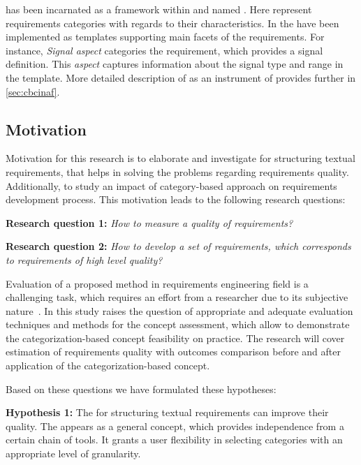 
\cbc has been incarnated as a framework within \autof and named \asp. Here \asp represent requirements categories with regards to their characteristics. In \af  the \asp have been implemented as templates supporting main facets of the requirements. For instance, \textit{Signal aspect} categories the requirement, which provides a signal definition. This \textit{aspect} captures information about the signal type and range in the template. More detailed description of \asp as an instrument of \cc provides further in \autoref{sec:cbcinaf}. 

\subsection{Motivation}
\label{sec:Motivation} 
Motivation for this research is to elaborate and investigate \cbc for structuring textual requirements, that helps in solving the problems regarding requirements quality. Additionally, to study an impact of category-based approach on requirements development process. This motivation leads to the following research questions: 

\textbf{Research question 1:} \textit{How to measure a quality of requirements?}

\textbf{Research question 2:} \textit{How to develop a set of requirements, which corresponds to requirements of high level quality?}

Evaluation of a proposed method in requirements engineering field is a challenging task, which requires an effort from a researcher due to its subjective nature~\cite{16NaPiRe}. In this study raises the question of appropriate and adequate evaluation techniques and methods for the concept assessment, which allow to demonstrate the categorization-based concept feasibility on practice. The research will cover estimation of requirements quality with outcomes comparison before and after application of the categorization-based concept.

Based on these questions we have formulated these hypotheses:

\textbf{Hypothesis 1:} The \cbc for structuring textual requirements can improve their quality. The \cc appears as a general concept, which provides independence from a certain chain of tools. It grants a user flexibility in selecting categories with an appropriate level of granularity. 

